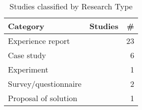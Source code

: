 
\begin{table}[bt]
	\centering
	\caption{Studies classified by Research Type\cite{DBLP:conf/sbes/BritoSCNB18}}
		{\begin{tabular}{l|p{1.6in}|r}
			\bf Category & \bf Studies & \bf \# \\
			\hline
			Experience report & \citep{id17882, id0135, id5343, id5353, id17796, id5357, id1088, id4503, id4663, id4811, id17805, id17830,id17845,id18433, id5329, id5335, id0089, id0115, id17800, id0106, id4966, id18359, id5328} & 23 \\
			Case study & \citep{id0093, id4815, id5546, id0134, id1192, id1193} & 6 \\
			Experiment &  \citep{id5676} & 1 \\
			Survey/questionnaire & \citep{id0098, id5147} & 2 \\
			Proposal of solution & \citep{id1097} & 1 \\	
		\end{tabular}} \label{tab:researchTypeStudies}
\end{table}